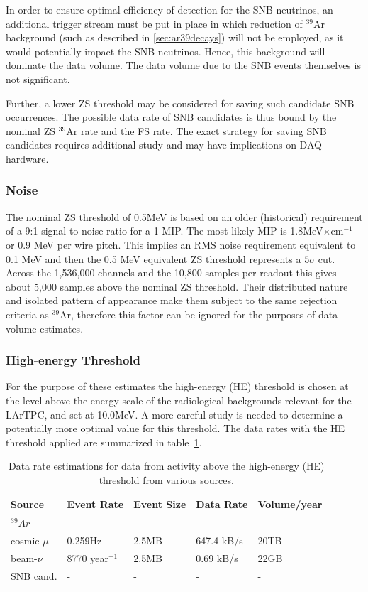 In order to ensure optimal efficiency of detection for the SNB neutrinos,
an  additional trigger stream must be put in place in which
reduction of $^{39}$Ar background (such as described in \ref{sec:ar39decays}) will not be employed, as it would potentially impact the SNB neutrinos. Hence, this background 
will dominate the data volume. The data volume due to the SNB events themselves is not significant.

Further, a lower ZS threshold may be considered for saving such
candidate SNB occurrences. The possible data rate of SNB candidates is thus bound by the nominal
ZS $^{39}$Ar rate and the FS rate. The exact strategy for saving SNB candidates requires additional study
and may have implications on DAQ hardware.

\subsubsection{Noise}

The nominal ZS threshold of 0.5MeV is based on an older (historical) requirement of a
9:1 signal to noise ratio for a 1 MIP. The most likely MIP is 1.8MeV$\times$cm$^{-1}$ or 0.9 MeV
per wire pitch. This implies an RMS noise requirement equivalent to 0.1 MeV and then the 0.5 MeV
equivalent ZS threshold represents a $5\sigma$ cut. Across the 1,536,000 channels and the
10,800 samples per readout this gives about 5,000 samples above the nominal ZS threshold.
Their distributed nature and isolated pattern of appearance make them subject to the same rejection
criteria as $^{39}$Ar, therefore this factor can be ignored for the purposes of data volume estimates.


\subsubsection{High-energy Threshold}

For the purpose of these estimates the  high-energy (HE) threshold is chosen at the level above 
the energy scale of the radiological backgrounds relevant for the LArTPC, and set at  10.0MeV.
A more careful study is needed to determine a potentially more optimal value for this threshold.
The data rates with the HE threshold applied are summarized in table~\ref{tab:he-volume}.

	
\begin{table}[ht!]
\centering
\begin{tabular}{| p{1.2in} | p{0.95in} | p{0.75in} | p{1in} | p{0.9in} |}		\hline	
Source & Event Rate & Event Size & Data Rate & Volume/year \\ \hline
$^{39}Ar$ & - & - & - & -\\	\hline
cosmic-$\mu$ & 0.259Hz & 2.5MB & 647.4 kB/s & 20TB \\ \hline
beam-$\nu$ & 8770 year$^{-1}$ & 2.5MB & 0.69 kB/s & 22GB \\
\hline
SNB cand. & - & - & - & -\\ \hline
\end{tabular}
\caption{Data rate estimations for data from activity above the high-energy (HE) threshold from
various sources.}
\label{tab:he-volume}
\end{table}


